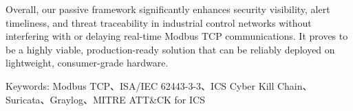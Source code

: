 Overall, our passive framework significantly enhances security visibility, alert timeliness, and threat traceability in industrial control networks without interfering with or delaying real-time Modbus TCP communications. It proves to be a highly viable, production-ready solution that can be reliably deployed on lightweight, consumer-grade hardware.

\noindent
{Keywords:  Modbus TCP、ISA/IEC 62443-3-3、ICS Cyber Kill Chain、Suricata、Graylog、MITRE ATT\&CK for ICS}